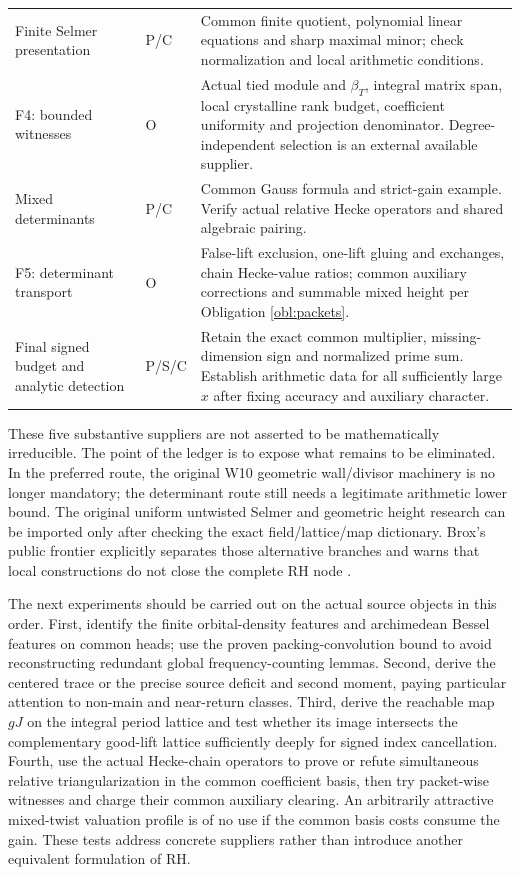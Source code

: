 \documentclass[11pt,a4paper]{article}
\begin{document}
\begin{longtable}{p{}p{}p{}}
Finite Selmer presentation & P/C & Common finite quotient, polynomial linear equations and sharp maximal minor; check normalization and local arithmetic conditions.\\
F4: bounded witnesses & O & Actual tied module and $\beta_T$, integral matrix span, local crystalline rank budget, coefficient uniformity and projection denominator. Degree-independent selection is an external available supplier.\\
Mixed determinants & P/C & Common Gauss formula and strict-gain example. Verify actual relative Hecke operators and shared algebraic pairing.\\
F5: determinant transport & O & False-lift exclusion, one-lift gluing and exchanges, chain Hecke-value ratios; common auxiliary corrections and summable mixed height per Obligation \ref{obl:packets}.\\
Final signed budget and analytic detection & P/S/C & Retain the exact common multiplier, missing-dimension sign and normalized prime sum. Establish arithmetic data for all sufficiently large $x$ after fixing accuracy and auxiliary character.\\\bottomrule
\end{longtable}
These five substantive suppliers are not asserted to be mathematically irreducible. The point of the ledger is to expose what remains to be eliminated. In the preferred route, the original W10 geometric wall/divisor machinery is no longer mandatory; the determinant route still needs a legitimate arithmetic lower bound. The original uniform untwisted Selmer and geometric height research can be imported only after checking the exact field/lattice/map dictionary. Brox's public frontier explicitly separates those alternative branches and warns that local constructions do not close the complete RH node \cite{broxfrontier}.

The next experiments should be carried out on the actual source objects in this order. First, identify the finite orbital-density features and archimedean Bessel features on common heads; use the proven packing-convolution bound to avoid reconstructing redundant global frequency-counting lemmas. Second, derive the centered trace or the precise source deficit and second moment, paying particular attention to non-main and near-return classes. Third, derive the reachable map $gJ$ on the integral period lattice and test whether its image intersects the complementary good-lift lattice sufficiently deeply for signed index cancellation. Fourth, use the actual Hecke-chain operators to prove or refute simultaneous relative triangularization in the common coefficient basis, then try packet-wise witnesses and charge their common auxiliary clearing. An arbitrarily attractive mixed-twist valuation profile is of no use if the common basis costs consume the gain. These tests address concrete suppliers rather than introduce another equivalent formulation of RH.
\end{document}
